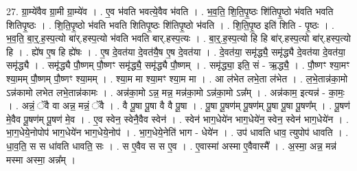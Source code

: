 \documentclass[17pt]{extarticle}
\begin{document}
27. ग्रा॒म्ये॑वैव ग्रा॒मी ग्रा॒म्ये॑व । . ए॒व भ॑वति भवत्ये॒वैव भ॑वति । . भ॒व॒ति॒ शि॒ति॒पृ॒ष्ठः शि॑तिपृ॒ष्ठो भ॑वति भवति शितिपृ॒ष्ठः । . शि॒ति॒पृ॒ष्ठो भ॑वति भवति शितिपृ॒ष्ठः शि॑तिपृ॒ष्ठो भ॑वति । . शि॒ति॒पृ॒ष्ठ इति॑ शिति - पृ॒ष्ठः । . भ॒व॒ति॒ बा॒र्॒.ह॒स्प॒त्यो बा॑र्.हस्प॒त्यो भ॑वति भवति बार्.हस्प॒त्यः । . बा॒र्॒.ह॒स्प॒त्यो हि हि बा॑र्.हस्प॒त्यो बा॑र्.हस्प॒त्यो हि । . ह्ये॑ष ए॒ष हि ह्ये॑षः । . ए॒ष दे॒वत॑या दे॒वत॑यै॒ष ए॒ष दे॒वत॑या । . दे॒वत॑या॒ समृ॑द्ध्यै॒ समृ॑द्ध्यै दे॒वत॑या दे॒वत॑या॒ समृ॑द्ध्यै । . समृ॑द्ध्यै पौ॒ष्णम् पौ॒ष्णꣳ समृ॑द्ध्यै॒ समृ॑द्ध्यै पौ॒ष्णम् । . समृ॑द्ध्या॒ इति॒ सं - ऋ॒द्ध्यै॒ । . पौ॒ष्णꣳ श्या॒मꣳ श्या॒मम् पौ॒ष्णम् पौ॒ष्णꣳ श्या॒मम् । . श्या॒म मा श्या॒मꣳ श्या॒म मा । . आ ल॑भेत लभे॒ता ल॑भेत । . ल॒भे॒तान्न॑का॒मो ऽन्न॑कामो लभेत लभे॒तान्न॑कामः । . अन्न॑का॒मो ऽन्न॒ मन्न॒ मन्न॑का॒मो ऽन्न॑का॒मो ऽन्न᳚म् । . अन्न॑काम॒ इत्यन्न॑ - का॒मः॒ । . अन्नं॒ ॅवै वा अन्न॒ मन्नं॒ ॅवै । . वै पू॒षा पू॒षा वै वै पू॒षा । . पू॒षा पू॒षण॑म् पू॒षण॑म् पू॒षा पू॒षा पू॒षण᳚म् । . पू॒षण॑ मे॒वैव पू॒षण॑म् पू॒षण॑ मे॒व । . ए॒व स्वेन॒ स्वेनै॒वैव स्वेन॑ । . स्वेन॑ भाग॒धेये॑न भाग॒धेये॑न॒ स्वेन॒ स्वेन॑ भाग॒धेये॑न । . भा॒ग॒धेये॒नोपोप॑ भाग॒धेये॑न भाग॒धेये॒नोप॑ । . भा॒ग॒धेये॒नेति॑ भाग - धेये॑न । . उप॑ धावति धाव॒ त्युपोप॑ धावति । . धा॒व॒ति॒ स स धा॑वति धावति॒ सः । . स ए॒वैव स स ए॒व । . ए॒वास्मा॑ अस्मा ए॒वैवास्मै᳚ । . अ॒स्मा॒ अन्न॒ मन्न॑ मस्मा अस्मा॒ अन्न᳚म् । \newline
\end{document}
